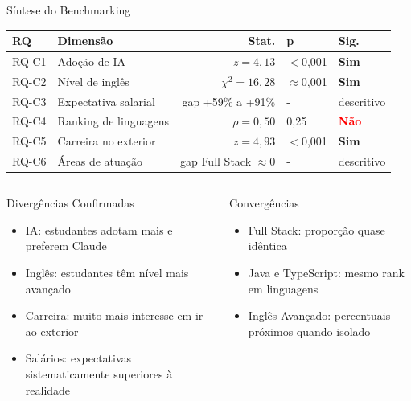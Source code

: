 \documentclass[fleqn]{beamer}
\begin{document}
\begin{frame}{Síntese do Benchmarking}
\scriptsize
\begin{table}[H]
\centering
\begin{tabular}{llrll}
\toprule
\textbf{RQ} & \textbf{Dimensão} & \textbf{Stat.} & \textbf{p} & \textbf{Sig.} \\
\midrule
RQ-C1 & Adoção de IA & $z=4{,}13$ & $<$0,001 & \textcolor{green!60!black}{\textbf{Sim}} \\
RQ-C2 & Nível de inglês & $\chi^2=16{,}28$ & $\approx$0,001 & \textcolor{green!60!black}{\textbf{Sim}} \\
RQ-C3 & Expectativa salarial & gap +59\% a +91\% & - & descritivo \\
RQ-C4 & Ranking de linguagens & $\rho=0{,}50$ & 0,25 & \textcolor{red}{\textbf{Não}} \\
RQ-C5 & Carreira no exterior & $z=4{,}93$ & $<$0,001 & \textcolor{green!60!black}{\textbf{Sim}} \\
RQ-C6 & Áreas de atuação & gap Full Stack $\approx$0 & - & descritivo \\
\bottomrule
\end{tabular}
\end{table}

\normalsize
\begin{columns}[T]
\begin{exampleblock}{Divergências Confirmadas}
\scriptsize
\begin{itemize}
    \item IA: estudantes adotam mais e preferem Claude
    \item Inglês: estudantes têm nível mais avançado
    \item Carreira: muito mais interesse em ir ao exterior
    \item Salários: expectativas sistematicamente superiores à realidade
\end{itemize}
\end{exampleblock}

\begin{block}{Convergências}
\scriptsize
\begin{itemize}
    \item Full Stack: proporção quase idêntica
    \item Java e TypeScript: mesmo rank em linguagens
    \item Inglês Avançado: percentuais próximos quando isolado
\end{itemize}
\end{block}
\end{columns}
\end{frame}
\end{document}
